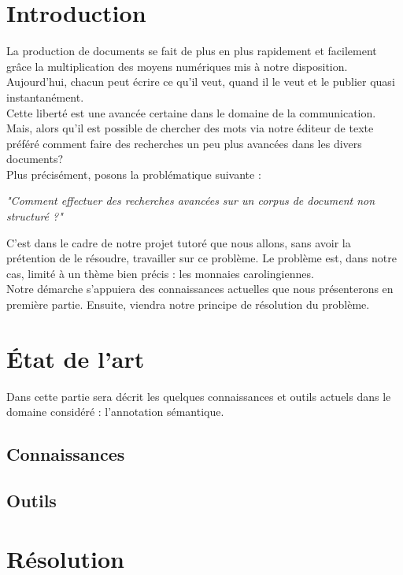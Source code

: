 \documentclass[a4paper, 11pt]{book}
\begin{document}
\chapter{Introduction}
La production de documents se fait de plus en plus rapidement et facilement grâce la multiplication des moyens numériques mis à notre disposition. Aujourd'hui, chacun peut écrire ce qu'il veut, quand il le veut et le publier quasi instantanément. \\
Cette liberté est une avancée certaine dans le domaine de la communication. Mais, alors qu'il est possible de chercher des mots via notre éditeur de texte préféré comment faire des recherches un peu plus avancées dans les divers documents? \\ Plus précisément, posons la problématique suivante : 
\begin{center}
\begin{Large}
\textit{"Comment effectuer des recherches avancées sur un corpus de document non structuré ?"}
\end{Large}
\end{center}
C'est dans le cadre de notre projet tutoré que nous allons, sans avoir la prétention de le résoudre, travailler sur ce problème. Le problème est, dans notre cas, limité à un thème bien précis : les monnaies carolingiennes.\\
 Notre démarche s'appuiera des connaissances actuelles que nous présenterons en première partie. Ensuite, viendra notre principe de résolution du problème.

\chapter{État de l'art}
Dans cette partie sera décrit les quelques connaissances et outils actuels dans le domaine considéré : l’annotation sémantique.
\section{Connaissances}

\section{Outils}
\chapter{Résolution}
\end{document}
